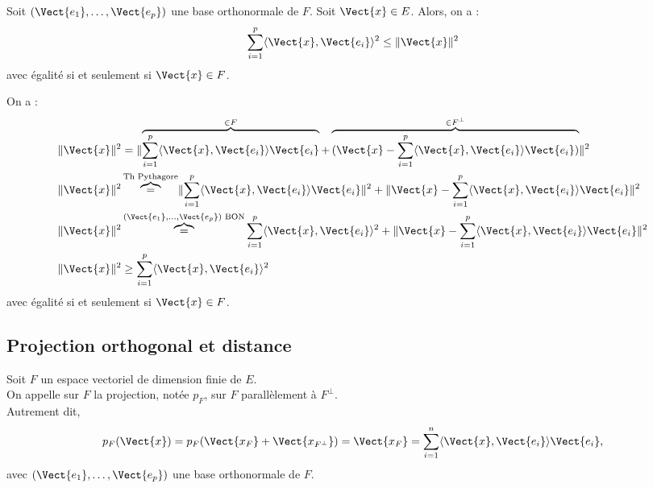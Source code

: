 \documentclass{book}
\begin{document}
\begin{Corollaire}
Soit $(\Vect{e_1},\dots,\Vect{e_p})$ une base orthonormale de $F$. Soit $\Vect{x}\in E$.
Alors, on a :
$$\sum_{i=1}^p \PS{\Vect{x}}{\Vect{e_i}}^2\leq \norme{\Vect{x}}^2$$
avec égalité si et seulement si $\Vect{x} \in F$.
\end{Corollaire}
\begin{Demonstration}
On a :
$$\begin{aligned}
\norme{\Vect{x}}^2 &=  \norme{\overbrace{\sum_{i=1}^p \PS{\Vect{x}}{\Vect{e_i}} \Vect{e_i}}^{\in F} +\overbrace{(\Vect{x}-\sum_{i=1}^p \PS{\Vect{x}}{\Vect{e_i}} \Vect{e_i})}^{\in F^{\perp} }}^2\\
\norme{\Vect{x}}^2 &\overbrace{=}^{\text{Th Pythagore}}\norme{\sum_{i=1}^p \PS{\Vect{x}}{\Vect{e_i}} \Vect{e_i}}^2 +\norme{\Vect{x}-\sum_{i=1}^p \PS{\Vect{x}}{\Vect{e_i}} \Vect{e_i}}^2\\
\norme{\Vect{x}}^2 &\overbrace{=}^{(\Vect{e_1},\dots,\Vect{e_p}) \text{ BON} }\sum_{i=1}^p \PS{\Vect{x}}{\Vect{e_i}}^2+\norme{\Vect{x}-\sum_{i=1}^p \PS{\Vect{x}}{\Vect{e_i}} \Vect{e_i}}^2\\
\norme{\Vect{x}}^2 &\geq \sum_{i=1}^p \PS{\Vect{x}}{\Vect{e_i}}^2
\end{aligned}$$
avec égalité si et seulement si $\Vect{x} \in F$.
\end{Demonstration}



\subsection{Projection orthogonal et distance}
\begin{Definition}
Soit $F$ un espace vectoriel de dimension finie de $E$.\\
On appelle  sur $F$ la projection, notée $p_F$, sur $F$ parallèlement à $F^{\perp}$.\\
Autrement dit, $$p_F(\Vect{x})=p_F(\Vect{x_F}+\Vect{x_{F^{\perp}}})=\Vect{x_F}=\sum_{i=1}^{n}\PS{\Vect{x}}{\Vect{e_i}} \Vect{e_i},$$
avec $(\Vect{e_1},\dots,\Vect{e_p})$ une base orthonormale de $F$. 
\begin{center}
\end{center}
\end{Definition}
\end{document}
